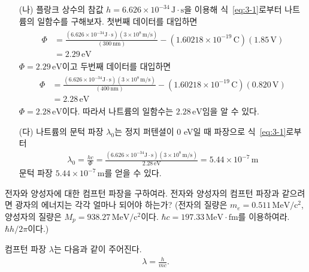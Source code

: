 \documentclass[tightenlines,floatfix,nofootinbib,superscriptaddress,fleqn]{revtex4}
\begin{document}
\begin{itemize}
  \item[(나)]
 플랑크 상수의 참값  $h=6.626\times 10^{-34}\,\mathrm{J\cdot s}$을 이용해 식~\eqref{eq:3-1}로부터
 나트륨의 일함수를 구해보자. 첫번째 데이터를 대입하면
 \begin{align}
  \begin{split}
    \Phi &= \frac{(6.626\times 10^{-34}\mathrm{J\cdot s})(3\times 10^{8}\,\mathrm{m/s})}
    {(300\,\mathrm{nm})}-(1.60218\times 10^{-19}\,\mathrm{C})(1.85\,\mathrm{V}) \\
    &= 2.29\,\mathrm{eV}
  \end{split}
 \end{align}
 $\Phi =  2.29\,\mathrm{eV}$이고 두번째 데이터를 대입하면
 \begin{align}
  \begin{split}
    \Phi &= \frac{(6.626\times 10^{-34}\mathrm{J\cdot s})(3\times 10^{8}\,\mathrm{m/s})}
    {(400\,\mathrm{nm})}-(1.60218\times 10^{-19}\,\mathrm{C})(0.820\,\mathrm{V}) \\
    &= 2.28\,\mathrm{eV}
  \end{split}
 \end{align}
 $\Phi =  2.28\,\mathrm{eV}$이다. 따라서 나트륨의 일함수는 $ 2.28\,\mathrm{eV}$임을 알 수 있다.
  \item[(다)]
  나트륨의 문턱 파장 $\lambda_0$는 정지 퍼텐셜이 $0$ eV일 때 파장으로 식~\eqref{eq:3-1}로부터
 \begin{align}
  \lambda_0 = \frac{hc}{\Phi} = \frac{(6.626\times 10^{-34}\mathrm{J\cdot s})(3\times 10^{8}\,\mathrm{m/s})}
  {2.28\,\mathrm{eV}}
  =5.44\times 10^{-7}\,\mathrm{m}
 \end{align}
  문턱 파장 $5.44\times 10^{-7}\,\mathrm{m}$를 얻을 수 있다.

\end{itemize}

\vspace{1cm}

전자와 양성자에 대한 컴프턴 파장을 구하여라. 전자와 양성자의 컴프턴
파장과 같으려면 광자의 에너지는 각각 얼마나 되어야 하는가?
(전자의 질량은 $m_e=0.511\, \mathrm{MeV/c^2}$, 양성자의 질량은
$M_p=938.27\,\mathrm{MeV/c^2}$이다. $\hbar c=197.33\,\mathrm{MeV\cdot
  fm}$를 이용하여라. $\hbar h/2\pi$이다.)  
 
컴프턴 파장 $\lambda$는 다음과 같이 주어진다.
\begin{align}
  \lambda = \frac{h}{mc}.
\end{align}
\end{document}
